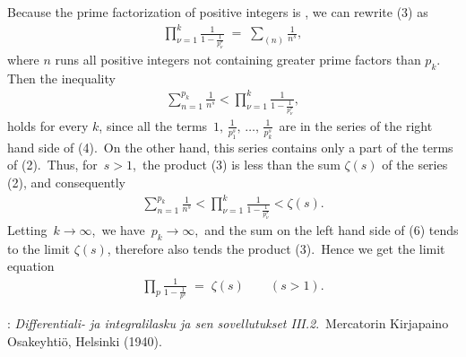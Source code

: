 \documentclass[12pt]{article}
\theoremstyle{definition}
\begin{document}
Because the prime factorization of positive integers is , we can rewrite (3) as
\begin{align}
\prod_{\nu=1}^k \frac{1}{1-\frac{1}{p_\nu^s}} \;=\; \sum_{(n)}\frac{1}{n^s},
\end{align}
where $n$ runs all positive integers not containing greater prime factors than $p_k$.\, Then the inequality
\begin{align}
\sum_{n=1}^{p_k}\frac{1}{n^s} < \prod_{\nu=1}^k \frac{1}{1-\frac{1}{p_\nu^s}},
\end{align}
holds for every $k$, since all the terms \,$1,\,\frac{1}{p_1^s},\,\ldots,\,\frac{1}{p_k^s}$\, are in the series of the right hand side of (4).\, On the other hand, this series contains only a part of the terms of (2).\, Thus, for\, $s > 1$,\, the product (3) is less than the sum $\zeta(s)$ of the series (2), and consequently
\begin{align}
\sum_{n=1}^{p_k}\frac{1}{n^s} < \prod_{\nu=1}^k \frac{1}{1-\frac{1}{p_\nu^s}} < \zeta(s).
\end{align}
Letting\, $k \to \infty$,\, we have\, $p_k \to \infty$,\, and the sum on the left hand side of (6) tends to the limit $\zeta(s)$, therefore also tends the product (3).\, Hence we get the limit equation
\begin{align}
\prod_{p}\frac{1}{1-\frac{1}{p^s}} \;=\; \zeta(s) \qquad (s > 1).
\end{align}

\begin{thebibliography}{8}
: {\em Differentiali- ja integralilasku
ja sen sovellutukset III.2}.\, Mercatorin Kirjapaino Osakeyhti\"o, Helsinki (1940).
\end{thebibliography}

\end{document}
